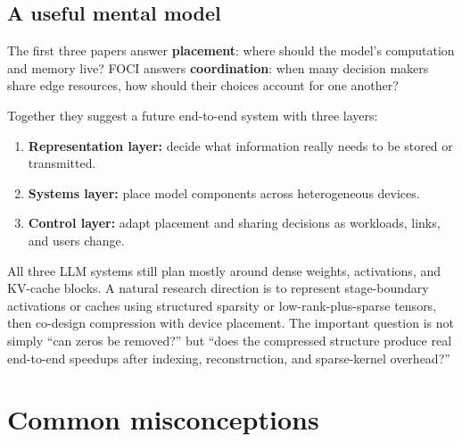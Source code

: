 \documentclass[10pt,a4paper]{article}
\begin{document}
\subsection{A useful mental model}

The first three papers answer \textbf{placement}: where should the model's computation and memory live? FOCI answers \textbf{coordination}: when many decision makers share edge resources, how should their choices account for one another?

Together they suggest a future end-to-end system with three layers:
\begin{enumerate}
  \item \textbf{Representation layer:} decide what information really needs to be stored or transmitted.
  \item \textbf{Systems layer:} place model components across heterogeneous devices.
  \item \textbf{Control layer:} adapt placement and sharing decisions as workloads, links, and users change.
\end{enumerate}

\begin{takeaway}
All three LLM systems still plan mostly around dense weights, activations, and KV-cache blocks. A natural research direction is to represent stage-boundary activations or caches using structured sparsity or low-rank-plus-sparse tensors, then co-design compression with device placement. The important question is not simply ``can zeros be removed?'' but ``does the compressed structure produce real end-to-end speedups after indexing, reconstruction, and sparse-kernel overhead?''
\end{takeaway}

\section{Common misconceptions}
\end{document}

